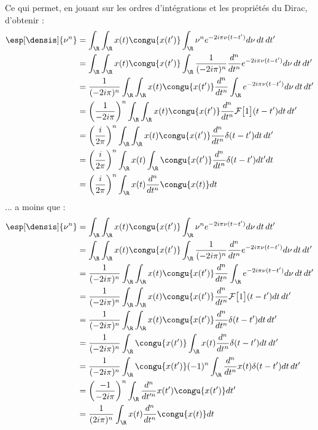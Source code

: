 \begin{demo}
	Ce qui permet, en jouant sur les ordres d'intégrations et les propriétés du Dirac, d'obtenir :
	\begin{align*}
		\esp[\densis]{\nu^n} &= \int_\R \int_\R x(t) \congu{x(t')} \int_\R \nu^n e^{-2i \pi \nu (t-t')} d\nu\, dt\, dt' \\
		&= \int_\R \int_\R x(t) \congu{x(t')} \int_\R \frac{1}{(-2i \pi)^n}\frac{d^n}{dt^n}e^{-2i \pi \nu(t-t')} d\nu\, dt\, dt' \\
		&= \frac{1}{(-2i \pi)^n} \int_\R \int_\R x(t) \congu{x(t')} \frac{d^n}{dt^n}\int_\R e^{-2i \pi \nu(t-t')} d\nu\, dt\, dt' \\
		&= \left(\frac{1}{-2i \pi}\right)^n \int_\R \int_\R x(t) \congu{x(t')} \frac{d^n}{dt^n}\mathcal{F}\big[1\big](t-t') dt\, dt' \\
		&= \left(\frac{i}{2 \pi}\right)^n \int_\R \int_\R x(t) \congu{x(t')} \frac{d^n}{dt^n}\delta(t-t') dt\, dt' \\
		&= \left(\frac{i}{2 \pi}\right)^n \int_\R x(t) \int_\R \congu{x(t')} \frac{d^n}{dt^n}\delta(t-t') dt' dt \\
		&= \left(\frac{i}{2 \pi}\right)^n  \int_\R x(t) \frac{d^n}{dt^n}  \congu{x(t)} dt
	\end{align*}
	... a moins que :
	\begin{align*}
		\esp[\densis]{\nu^n} &= \int_\R \int_\R x(t) \congu{x(t')} \int_\R \nu^n e^{-2i \pi \nu (t-t')} d\nu\, dt\, dt' \\
		&= \int_\R \int_\R x(t) \congu{x(t')} \int_\R \frac{1}{(-2i \pi)^n}\frac{d^n}{dt^n}e^{-2i \pi \nu(t-t')} d\nu\, dt\, dt' \\
		&= \frac{1}{(-2i \pi)^n} \int_\R \int_\R x(t) \congu{x(t')} \frac{d^n}{dt^n}\int_\R e^{-2i \pi \nu(t-t')} d\nu\, dt\, dt' \\
		&= \frac{1}{(-2 i\pi)^n} \int_\R \int_\R x(t) \congu{x(t')} \frac{d^n}{dt^n}\mathcal{F}\big[1\big](t-t') dt\, dt' \\
		&= \frac{1}{(-2 i\pi)^n} \int_\R \int_\R x(t) \congu{x(t')} \frac{d^n}{dt^n}\delta(t-t') dt\, dt' \\
		&= \frac{1}{(-2 i\pi)^n} \int_\R \congu{x(t')} \int_\R x(t) \frac{d^n}{dt^n}\delta(t-t') dt\, dt' \\
		&= \frac{1}{(-2 i\pi)^n} \int_\R \congu{x(t')}(-1)^n\int_\R \frac{d^n}{dt^n}x(t) \delta(t-t') dt\, dt' \\
		&= \left(\frac{-1}{-2i \pi}\right)^n \int_\R \frac{d^n}{dt'^n}x(t') \congu{x(t')}  dt' \\
		&= \frac{1}{(2 i\pi)^n}  \int_\R x(t) \frac{d^n}{dt^n}  \congu{x(t)} dt
	\end{align*}
\end{demo}



